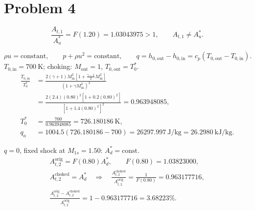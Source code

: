 \section*{Problem 4}


\[
\frac{A_{t,1}}{A_u^*}=F(1.20)=1.03043975>1,
\qquad A_{t,1}\ne A_u^*.
\]

\[
\rho u=\text{constant},\qquad p+\rho u^2=\text{constant},\qquad
q=h_{0,\mathrm{out}}-h_{0,\mathrm{in}}
=c_p(T_{0,\mathrm{out}}-T_{0,\mathrm{in}}).
\]
$T_{0,\mathrm{in}}=700~\mathrm K$; choking: $M_{\mathrm{out}}=1$, $T_{0,\mathrm{out}}=T_0^*$.
\begin{align*}
\frac{T_{0,\mathrm{in}}}{T_0^*}
&=\frac{2(\gamma+1)M_{\mathrm{in}}^2
\left[1+\frac{\gamma-1}{2}M_{\mathrm{in}}^2\right]}
{(1+\gamma M_{\mathrm{in}}^2)^2}\\
&=\frac{2(2.4)(0.80)^2[1+0.2(0.80)^2]}
{[1+1.4(0.80)^2]^2}=0.963948085,\\
T_0^*&=\frac{700}{0.963948085}=726.180186~\mathrm K,\\
q_a&=1004.5(726.180186-700)=26297.997~\mathrm{J/kg}
=\boxed{26.2980~\mathrm{kJ/kg}}.
\end{align*}

$q=0$, fixed shock at $M_{1s}=1.50$: $A_d^*=\mathrm{const.}$
\begin{gather*}
A_{t,2}^{\mathrm{orig}}=F(0.80)A_d^*,\qquad F(0.80)=1.03823000,\\
A_{t,2}^{\mathrm{choked}}=A_d^*
\quad\Longrightarrow\quad
\frac{A_{t,2}^{\mathrm{choked}}}{A_{t,2}^{\mathrm{orig}}}
=\frac{1}{F(0.80)}=0.963177716,\\
\boxed{\frac{A_{t,2}^{\mathrm{orig}}-A_{t,2}^{\mathrm{choked}}}
{A_{t,2}^{\mathrm{orig}}}=1-0.963177716=3.68223\%.}
\end{gather*}

